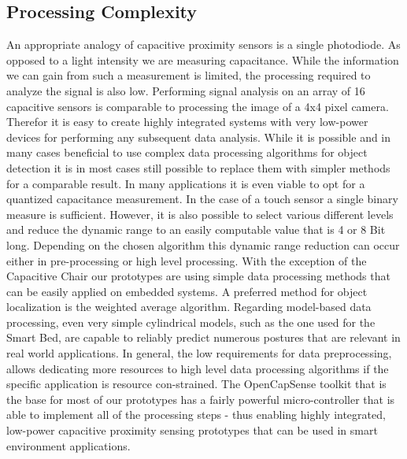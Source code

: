 \subsection{Processing Complexity}
An appropriate analogy of capacitive proximity sensors is a single photodiode. As opposed to a light intensity we are measuring capacitance. While the information we can gain from such a measurement is limited, the processing required to analyze the signal is also low. Performing signal analysis on an array of 16 capacitive sensors is comparable to processing the image of a 4x4 pixel camera. Therefor it is easy to create highly integrated systems with very low-power devices for performing any subsequent data analysis. While it is possible and in many cases beneficial to use complex data processing algorithms for object detection it is in most cases still possible to replace them with simpler methods for a comparable result.
In many applications it is even viable to opt for a quantized capacitance measurement. In the case of a touch sensor a single binary measure is sufficient. However, it is also possible to select various different levels and reduce the dynamic range to an easily computable value that is 4 or 8 Bit long. Depending on the chosen algorithm this dynamic range reduction can occur either in pre-processing or high level processing.
With the exception of the Capacitive Chair our prototypes are using simple data processing methods that can be easily applied on embedded systems. A preferred method for object localization is the weighted average algorithm. Regarding model-based data processing, even very simple cylindrical models, such as the one used for the Smart Bed, are capable to reliably predict numerous postures that are relevant in real world applications. In general, the low requirements for data preprocessing, allows dedicating more resources to high level data processing algorithms if the specific application is resource con-strained. 
The OpenCapSense toolkit that is the base for most of our prototypes has a fairly powerful micro-controller that is able to implement all of the processing steps - thus enabling highly integrated, low-power capacitive proximity sensing prototypes that can be used in smart environment applications.